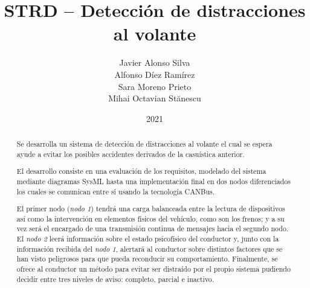 \documentclass[a4paper,oneside,12pt]{article}
\author{Javier Alonso Silva\\Alfonso Díez Ramírez\\Sara Moreno Prieto\\Mihai Octavian St\u{a}nescu}
\title{STRD -- Detección de distracciones al volante}
\date{2021}
\newcommand{\settttsize}[1]{\def\ttsize{#1}}%
\begin{document}
\settttsize{\footnotesize}
\ActivateVerbatimLigatures
\maketitle
\begin{abstract}
    Se desarrolla un sistema de detección de distracciones al volante el
    cual se espera ayude a evitar los posibles accidentes derivados de
    la casuística anterior.

    El desarrollo consiste en una evaluación de los requisitos, modelado del
    sistema mediante diagramas SysML hasta una implementación final en dos
    nodos diferenciados los cuales se comunican entre sí usando la tecnología
    CANBus.

    El primer nodo (\textit{nodo 1}) tendrá una carga balanceada entre la lectura
    de dispositivos así como la intervención en elementos físicos del vehículo,
    como son los frenos; y a su vez será el encargado de una transmisión continua
    de mensajes hacia el segundo nodo. El \textit{nodo 2} leerá información sobre
    el estado psicofísico del conductor y, junto con la información recibida del
    \textit{nodo 1}, alertará al conductor sobre distintos factores que se han visto
    peligrosos para que pueda reconducir su comportamiento. Finalmente, se ofrece
    al conductor un método para evitar ser distraído por el propio sistema pudiendo
    decidir entre tres niveles de aviso: completo, parcial e inactivo.
\end{abstract}
\end{document}
